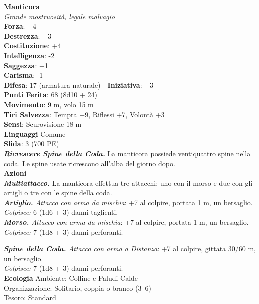 \begin{multicols}{2}
\medskip\textbf{Manticora}\\
\emph{Grande mostruosità, legale malvagio}\\
\textbf{Forza}: +4\\
\textbf{Destrezza}: +3\\
\textbf{Costituzione}: +4\\
\textbf{Intelligenza}: -2\\
\textbf{Saggezza}: +1\\
\textbf{Carisma}: -1\\
\textbf{Difesa}: 17 (armatura naturale) - \textbf{Iniziativa}: +3\\
\textbf{Punti Ferita}: 68 (8d10 + 24)\\
\textbf{Movimento}: 9 m, volo 15 m\\
\textbf{Tiri Salvezza}: Tempra +9, Riflessi +7, Volontà +3\\
\textbf{Sensi}: Scurovisione 18 m\\
\textbf{Linguaggi} Comune\\
\textbf{Sfida}: 3 (700 PE)\smallskip\\
\emph{\textbf{Ricrescere Spine della Coda.}} La manticora possiede ventiquattro spine nella coda. Le spine usate ricrescono all'alba del giorno dopo.\\

\smallskip\textbf{Azioni}\\

\emph{\textbf{Multiattacco.}} La manticora effettua tre attacchi: uno con il morso e due con gli artigli o tre con le spine della coda.\\

\emph{\textbf{Artiglio.} Attacco con arma da mischia}: +7 al colpire, portata 1 m, un bersaglio.\\

\emph{Colpisce:} 6 (1d6 + 3) danni taglienti.\\

\emph{\textbf{Morso.} Attacco con arma da mischia}: +7 al colpire, portata 1 m, un bersaglio.\\

\emph{Colpisce:} 7 (1d8 + 3) danni perforanti.

\emph{\textbf{Spine della Coda.} Attacco con arma a Distanza}: +7 al colpire, gittata 30/60 m, un bersaglio.\\

\emph{Colpisce:} 7 (1d8 + 3) danni perforanti.\\
\textbf{Ecologia}
Ambiente: Colline e Paludi Calde\\
Organizzazione: Solitario, coppia o branco (3–6)\\
Tesoro: Standard\\


\end{multicols}

